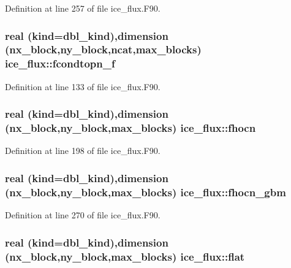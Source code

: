 Definition at line 257 of file ice\_\-flux.F90.\hypertarget{namespaceice__flux_af7ddfda012c0a29dc4624f3914ea09f9}{
\subsubsection[{fcondtopn\_\-f}]{\setlength{\rightskip}{0pt plus 5cm}real (kind=dbl\_\-kind),dimension (nx\_\-block,ny\_\-block,ncat,max\_\-blocks) {\bf ice\_\-flux::fcondtopn\_\-f}}}
\label{namespaceice__flux_af7ddfda012c0a29dc4624f3914ea09f9}


Definition at line 133 of file ice\_\-flux.F90.\hypertarget{namespaceice__flux_ad13e4555d29196de5e5e1130432c5a3a}{
\subsubsection[{fhocn}]{\setlength{\rightskip}{0pt plus 5cm}real (kind=dbl\_\-kind),dimension (nx\_\-block,ny\_\-block,max\_\-blocks) {\bf ice\_\-flux::fhocn}}}
\label{namespaceice__flux_ad13e4555d29196de5e5e1130432c5a3a}


Definition at line 198 of file ice\_\-flux.F90.\hypertarget{namespaceice__flux_a0262e88be5633673703d664fdb6e5123}{
\subsubsection[{fhocn\_\-gbm}]{\setlength{\rightskip}{0pt plus 5cm}real (kind=dbl\_\-kind),dimension (nx\_\-block,ny\_\-block,max\_\-blocks) {\bf ice\_\-flux::fhocn\_\-gbm}}}
\label{namespaceice__flux_a0262e88be5633673703d664fdb6e5123}


Definition at line 270 of file ice\_\-flux.F90.\hypertarget{namespaceice__flux_ab2d967d4946f473fc077416bdd6cd13f}{
\subsubsection[{flat}]{\setlength{\rightskip}{0pt plus 5cm}real (kind=dbl\_\-kind),dimension (nx\_\-block,ny\_\-block,max\_\-blocks) {\bf ice\_\-flux::flat}}}
\label{namespaceice__flux_ab2d967d4946f473fc077416bdd6cd13f}



